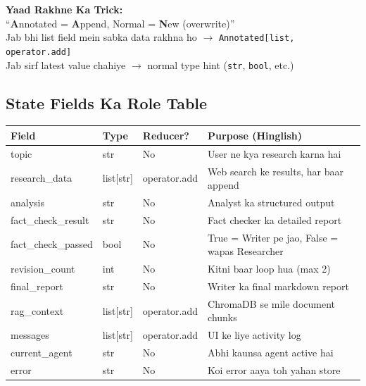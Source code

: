 \documentclass[12pt, a4paper]{article}
\begin{document}
\begin{memorybox}
\textbf{Yaad Rakhne Ka Trick:} \\
``\textbf{A}nnotated = \textbf{A}ppend, Normal = \textbf{N}ew (overwrite)'' \\[4pt]
Jab bhi list field mein sabka data rakhna ho $\rightarrow$ \texttt{Annotated[list, operator.add]} \\
Jab sirf latest value chahiye $\rightarrow$ normal type hint (\texttt{str}, \texttt{bool}, etc.)
\end{memorybox}

\subsection{State Fields Ka Role Table}

\begin{center}
\small
\begin{longtable}{|>{\ttfamily\small}p{3.5cm}|p{2cm}|p{2cm}|p{5.5cm}|}
\hline
\rowcolor{accentpurple!15}
\textbf{Field} & \textbf{Type} & \textbf{Reducer?} & \textbf{Purpose (Hinglish)} \\
\hline\hline
topic & str & No & User ne kya research karna hai \\
\hline
research\_data & list[str] & operator.add & Web search ke results, har baar append \\
\hline
analysis & str & No & Analyst ka structured output \\
\hline
fact\_check\_result & str & No & Fact checker ka detailed report \\
\hline
fact\_check\_passed & bool & No & True = Writer pe jao, False = wapas Researcher \\
\hline
revision\_count & int & No & Kitni baar loop hua (max 2) \\
\hline
final\_report & str & No & Writer ka final markdown report \\
\hline
rag\_context & list[str] & operator.add & ChromaDB se mile document chunks \\
\hline
messages & list[str] & operator.add & UI ke liye activity log \\
\hline
current\_agent & str & No & Abhi kaunsa agent active hai \\
\hline
error & str & No & Koi error aaya toh yahan store \\
\hline
\end{longtable}
\end{center}


\newpage
\end{document}
